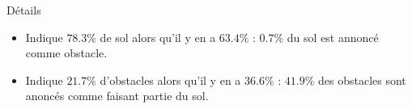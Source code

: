 \begin{frame}
\begin{center}
{\begin{tabular}{cc}
            \end{tabular}
            \begin{block}{Détails}
                \begin{itemize}
                    \item Indique $78.3\%$ de sol alors qu'il y en a $63.4\%$ : $0.7\%$  du sol est annoncé comme obstacle.
                    \item Indique $21.7\%$ d'obstacles alors qu'il y en a $36.6\%$ : $41.9\%$ des obstacles sont anoncés comme faisant partie du sol.
                \end{itemize}
            \end{block}
        }
    \end{center}
\end{frame}

